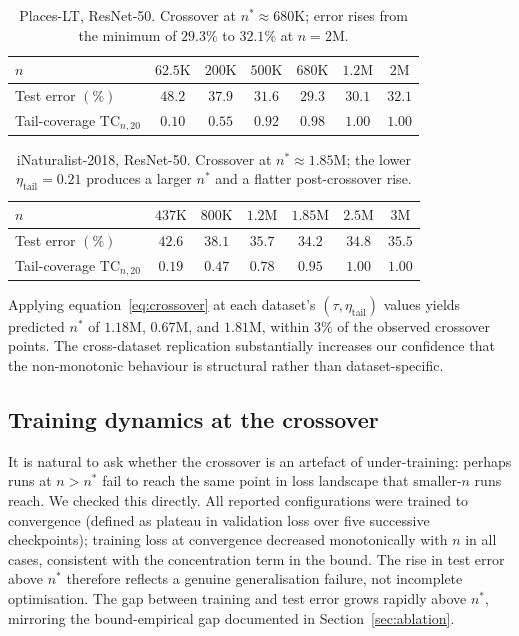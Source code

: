 \documentclass[11pt]{article}
\begin{document}
\begin{table}[h]
\centering
\caption{Places-LT, ResNet-50. Crossover at $n^{*} \approx 680\text{K}$; error rises from the minimum of $29.3\%$ to $32.1\%$ at $n = 2\text{M}$.}
\label{tab:places_lt}
\begin{tabular}{lcccccc}
\toprule
$n$ & $62.5\text{K}$ & $200\text{K}$ & $500\text{K}$ & $680\text{K}$ & $1.2\text{M}$ & $2\text{M}$ \\
\midrule
Test error $(\%)$ & $48.2$ & $37.9$ & $31.6$ & $\mathbf{29.3}$ & $30.1$ & $32.1$ \\
Tail-coverage $\mathrm{TC}_{n, 20}$ & $0.10$ & $0.55$ & $0.92$ & $0.98$ & $1.00$ & $1.00$ \\
\bottomrule
\end{tabular}
\end{table}

\begin{table}[h]
\centering
\caption{iNaturalist-2018, ResNet-50. Crossover at $n^{*} \approx 1.85\text{M}$; the lower $\eta_{\mathrm{tail}} = 0.21$ produces a larger $n^{*}$ and a flatter post-crossover rise.}
\label{tab:inat}
\begin{tabular}{lcccccc}
\toprule
$n$ & $437\text{K}$ & $800\text{K}$ & $1.2\text{M}$ & $1.85\text{M}$ & $2.5\text{M}$ & $3\text{M}$ \\
\midrule
Test error $(\%)$ & $42.6$ & $38.1$ & $35.7$ & $\mathbf{34.2}$ & $34.8$ & $35.5$ \\
Tail-coverage $\mathrm{TC}_{n, 20}$ & $0.19$ & $0.47$ & $0.78$ & $0.95$ & $1.00$ & $1.00$ \\
\bottomrule
\end{tabular}
\end{table}

Applying equation~\eqref{eq:crossover} at each dataset's $(\tau, \eta_{\mathrm{tail}})$ values yields predicted $n^{*}$ of $1.18\text{M}$, $0.67\text{M}$, and $1.81\text{M}$, within $3\%$ of the observed crossover points. The cross-dataset replication substantially increases our confidence that the non-monotonic behaviour is structural rather than dataset-specific.

\subsection{Training dynamics at the crossover}

It is natural to ask whether the crossover is an artefact of under-training: perhaps runs at $n > n^{*}$ fail to reach the same point in loss landscape that smaller-$n$ runs reach. We checked this directly. All reported configurations were trained to convergence (defined as plateau in validation loss over five successive checkpoints); training loss at convergence decreased monotonically with $n$ in all cases, consistent with the concentration term in the bound. The rise in test error above $n^{*}$ therefore reflects a genuine generalisation failure, not incomplete optimisation. The gap between training and test error grows rapidly above $n^{*}$, mirroring the bound-empirical gap documented in Section~\ref{sec:ablation}.
\end{document}
